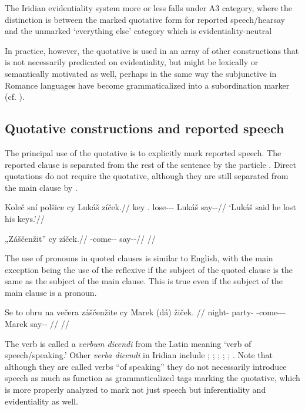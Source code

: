 The Iridian evidentiality system more or less falls under
 A3 category, where the distinction is between the
marked quotative form for reported speech/hearsay and the unmarked ‘everything
else’ category which is evidentiality-neutral

In practice, however, the quotative is used in an array of other constructions
that is not necessarily predicated on evidentiality, but might be lexically or
semantically motivated as well, perhaps in the same way the subjunctive in
Romance languages have become grammaticalized into a subordination marker (cf.
\cite{poplacketal}).

\subsection{Quotative constructions and reported
speech}\label{sec:quotative-const}

The principal use of the quotative is to explicitly mark reported speech. The
reported clause is separated from the rest of the sentence by the particle
. Direct quotations do not require the quotative, although they are
still separated from the main clause by .

\pex
  \begingl
    \gla Koleč sní polšice cy Lukáš zíček.//
    \glb key \Refl{}.\Acc{} lose-\Av{}-\Pf{}-\Quot{} \Qp{} Lukáš say-\Av{}-\Pf{}//
    \glft ‘Lukáš said he lost his keys.’//
  \endgl
\xe

\pex
  \begingl
    \gla „Záščenžit” cy zíček.//
    \glb \First{}\Sg{} \Neg{}-come-\Av{}-\SupP{} \Qp{} say-\Av{}-\Pf{}//
    \glft {}//
  \endgl
\xe

The use of pronouns in quoted clauses is similar to English, with the main
exception being the use of the reflexive  if the subject of the quoted
clause is the same as the subject of the main clause. This is true even if the
subject of the main clause is a pronoun.

\pex
  \begingl
    \gla Se to obru na večera záščenžite cy Marek (dá) žiček. //
    \glb \Refl{} \Dem{} night-\Ins{} \Loc{} party-\Acc{} \Neg{}-come-\Av{}-\SupP{}-\Quot{} \Qp{} Marek \First\Sg{} say-\Av{}-\Pf{} //
    \glft {}//
  \endgl
\xe

The verb  is called a \emph{verbum dicendi} from the Latin meaning ‘verb of speech/speaking.’ Other \emph{verba
dicendi} in Iridian include ; ;
; ; ;
. Note that although they are called
verbs ``of speaking'' they do not necessarily introduce speech as much as
function as grammaticalized tags marking the quotative,  which is more properly
analyzed to mark not just speech but inferentiality and evidentiality as well.

